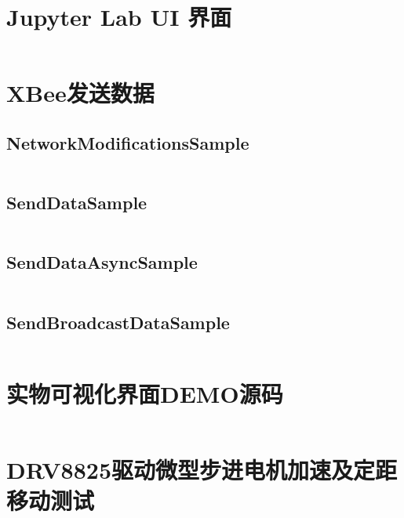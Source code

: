 \section{Jupyter Lab UI 界面}
\label{sec:JupyterLabUI-Code}
\inputminted[mathescape, linenos, breaklines]{python3}{Code/UI.py}

\section{XBee发送数据}

\subsection{NetworkModificationsSample}
\label{sec:NetworkModificationsSample}
\inputminted[mathescape, linenos, breaklines]{python3}{Code/NetworkModificationsSample/NetworkModificationsSample.py}

\subsection{SendDataSample}
\label{sec:SendDataSample}
\inputminted[mathescape, linenos, breaklines]{python3}{Code/SendDataSample/SendDataSample.py}

\subsection{SendDataAsyncSample}
\label{sec:SendDataAsyncSample}
\inputminted[mathescape, linenos, breaklines]{python3}{Code/SendDataAsyncSample/SendDataAsyncSample.py}

\subsection{SendBroadcastDataSample}
\label{sec:SendBroadcastDataSample}
\inputminted[mathescape, linenos, breaklines]{python3}{Code/SendBroadcastDataSample/SendBroadcastDataSample.py}

\section{实物可视化界面DEMO源码}
\label{sec:MisakaCarV1}
\inputminted[mathescape, linenos, breaklines]{c}{Code/MisakaCarV1/MisakaCarV1.ino}


\section{DRV8825驱动微型步进电机加速及定距移动测试}

